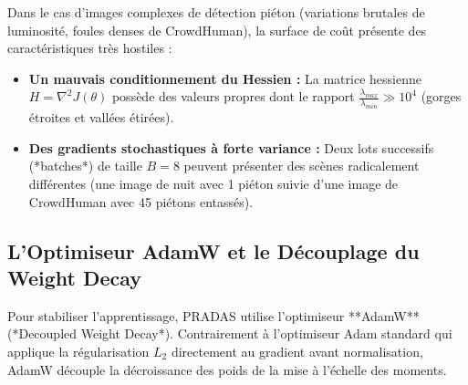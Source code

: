 \documentclass[11pt,a4paper]{article}
\begin{document}
Dans le cas d'images complexes de détection piéton (variations brutales de luminosité, foules denses de CrowdHuman), la surface de coût présente des caractéristiques très hostiles :
\begin{itemize}
    \item \textbf{Un mauvais conditionnement du Hessien :} La matrice hessienne $H = \nabla^2 J(\theta)$ possède des valeurs propres dont le rapport $\frac{\lambda_{max}}{\lambda_{min}} \gg 10^4$ (gorges étroites et vallées étirées).
    \item \textbf{Des gradients stochastiques à forte variance :} Deux lots successifs (*batches*) de taille $B=8$ peuvent présenter des scènes radicalement différentes (une image de nuit avec 1 piéton suivie d'une image de CrowdHuman avec 45 piétons entassés).
\end{itemize}

\subsection{L'Optimiseur AdamW et le Découplage du Weight Decay}
Pour stabiliser l'apprentissage, PRADAS utilise l'optimiseur **AdamW** (*Decoupled Weight Decay*). Contrairement à l'optimiseur Adam standard qui applique la régularisation $L_2$ directement au gradient avant normalisation, AdamW découple la décroissance des poids de la mise à l'échelle des moments.
\end{document}
